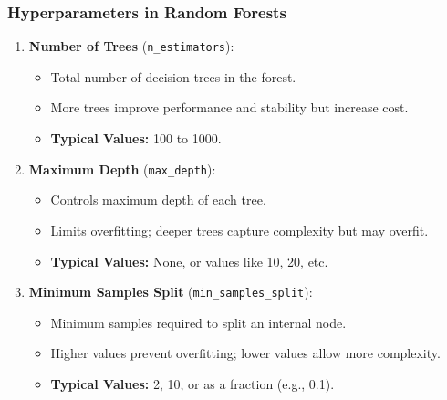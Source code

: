 \documentclass[aspectratio=169]{beamer}
\begin{document}
\begin{frame}[fragile]
    \frametitle{Hyperparameters in Random Forests}
    \begin{enumerate}
        \item \textbf{Number of Trees} (\texttt{n\_estimators}):
            \begin{itemize}
                \item Total number of decision trees in the forest.
                \item More trees improve performance and stability but increase cost.
                \item \textbf{Typical Values:} 100 to 1000.
            \end{itemize}
        
        \item \textbf{Maximum Depth} (\texttt{max\_depth}):
            \begin{itemize}
                \item Controls maximum depth of each tree.
                \item Limits overfitting; deeper trees capture complexity but may overfit.
                \item \textbf{Typical Values:} None, or values like 10, 20, etc.
            \end{itemize}
        
        \item \textbf{Minimum Samples Split} (\texttt{min\_samples\_split}):
            \begin{itemize}
                \item Minimum samples required to split an internal node.
                \item Higher values prevent overfitting; lower values allow more complexity.
                \item \textbf{Typical Values:} 2, 10, or as a fraction (e.g., 0.1).
            \end{itemize}
    \end{enumerate}
\end{frame}
\end{document}
